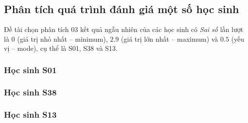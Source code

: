 \subsection{Phân tích quá trình đánh giá một số học sinh}

Đề tài chọn phân tích 03 kết quả ngẫu nhiên của các học sinh có \textit{Sai số} lần lượt là $0$ (giá trị nhỏ nhất – minimum), $2.9$ (giá trị lớn nhất – maximum) và $0.5$ (yếu vị – mode), cụ thể là S01, S38 và S13.\par

\subsubsection{Học sinh S01}

\subsubsection{Học sinh S38}

\subsubsection{Học sinh S13}
